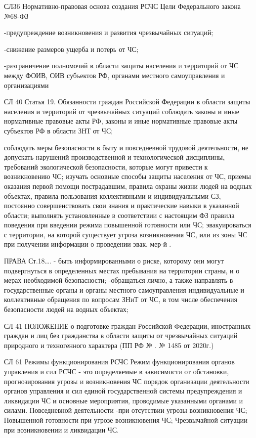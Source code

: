 \documentclass[a4paper, 12pt]{article}
\theoremstyle{definition}
\begin{document}
        СЛ36                     Нормативно-правовая основа создания РСЧС
        Цели  Федерального закона №68-ФЗ
        
        -предупреждение возникновения и развития чрезвычайных ситуаций;
        
        -снижение размеров ущерба и потерь от ЧС;
        
        -разграничение полномочий в области защиты населения и территорий от ЧС между ФОИВ, ОИВ субъектов РФ, органами местного самоуправления и организациями
        
        СЛ 40 Статья 19. Обязанности граждан Российской Федерации в области защиты населения и территорий от чрезвычайных ситуаций
        соблюдать законы и иные нормативные правовые акты РФ, законы и иные нормативные правовые акты субъектов РФ в области ЗНТ от ЧС;
        
        соблюдать меры безопасности в быту и повседневной трудовой деятельности, не допускать нарушений производственной и технологической дисциплины, требований экологической безопасности, которые могут привести к возникновению ЧС;
        изучать основные способы защиты населения от ЧС, приемы оказания первой помощи пострадавшим, правила охраны жизни людей на водных объектах, правила пользования коллективными и индивидуальными СЗ, постоянно совершенствовать свои знания и практические навыки в указанной области;
        выполнять установленные в соответствии с настоящим ФЗ правила поведения при введении режима повышенной готовности или ЧС;
        эвакуироваться с территории, на которой существует угроза возникновения ЧС, или из зоны ЧС при получении информации о проведении эвак. мер-й .
        
        ПРАВА Ст.18…. - быть информированными о риске, которому они могут подвергнуться в определенных местах пребывания на территории страны, и о мерах необходимой безопасности;
        -обращаться лично, а также направлять в государственные органы и органы местного самоуправления индивидуальные и коллективные обращения по вопросам ЗНиТ от ЧС, в том числе обеспечения безопасности людей на водных объектах;
        
        СЛ 41     ПОЛОЖЕНИЕ о подготовке граждан Российской Федерации, иностранных граждан и лиц без гражданства в области защиты от чрезвычайных ситуаций природного и техногенного характера (ПП РФ № . № 1485 от 2020г.)
        
        СЛ 61 Режимы функционирования РСЧС
        Режим функционирования органов управления и сил РСЧС - это определяемые в зависимости от обстановки, прогнозирования угрозы  и возникновения ЧС порядок организации деятельности органов управления и сил единой государственной системы предупреждения и ликвидации ЧС и основные мероприятия, проводимые указанными органами и силами.
        Повседневной деятельности  -при отсутствии угрозы возникновения ЧС;
        Повышенной готовности при угрозе возникновения ЧС;
        Чрезвычайной ситуации при возникновении и ликвидации ЧС.
        
\end{document}
